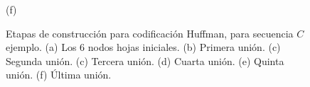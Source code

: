 \begin{figure}
\begin{minipage}{1\textwidth}
\begin{minipage}{0.45\textwidth}
    			(f)
    		\end{minipage}  
    	\end{minipage}
    	
    	 
    \caption{Etapas de construcción para codificación Huffman, para secuencia $C$ ejemplo. (a) Los 6 nodos hojas iniciales. (b) Primera unión. (c) Segunda unión. (c) Tercera unión. (d) Cuarta unión. (e) Quinta unión. (f) Última unión.}
    \label{fig:huffman2}
\end{figure}
